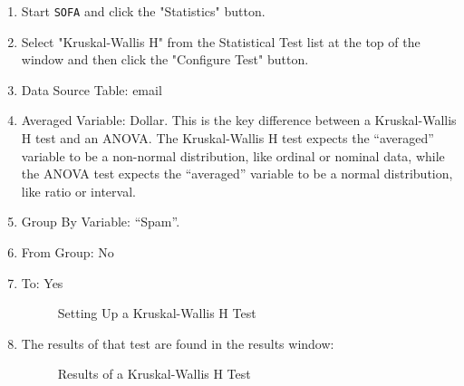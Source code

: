 \begin{enumerate}
  \item Start \texttt{SOFA} and click the "Statistics" button.
  \item Select "Kruskal-Wallis H" from the Statistical Test list at the top of the window and then click the "Configure Test" button.
  \item Data Source Table: email
  \item Averaged Variable: Dollar. This is the key difference between a Kruskal-Wallis H test and an ANOVA. The Kruskal-Wallis H test expects the ``averaged'' variable to be a non-normal distribution, like ordinal or nominal data, while the ANOVA test expects the ``averaged'' variable to be a normal distribution, like ratio or interval.
  \item Group By Variable: ``Spam''.
  \item From Group: No
  \item To: Yes
  
  \begin{figure}[H]
    \begin{center}
      \caption{Setting Up a Kruskal-Wallis H Test}
    \end{center}
  \end{figure}
  
  \item The results of that test are found in the results window:
  
  \begin{figure}[H]
    \begin{center}
      \caption{Results of a Kruskal-Wallis H Test}
    \end{center}
  \end{figure}


\end{enumerate}
